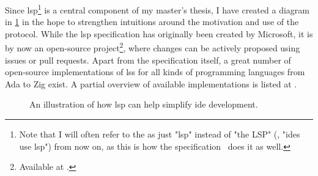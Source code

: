 \documentclass[../thesis]{subfiles}
\begin{document}
\noindent{}Since \gls{lsp}\footnote{%
	Note that I will often refer to the  as just "\gls{lsp}" instead of "the LSP" (\eg, "\glspl{ide} use \gls{lsp}") from now on, as this is how the specification~\cite{lsp} does it as well.
} is a central component of my master's thesis, I have created a diagram in \cref{fig:lsp} in the hope to strengthen intuitions around the motivation and use of the protocol.
While the \gls{lsp} specification has originally been created by Microsoft, it is by now an open-source project\footnote{
	Available at .
}, where changes can be actively proposed using issues or pull requests.
Apart from the specification itself, a great number of open-source implementations of \glspl{ls} for all kinds of programming languages from Ada to Zig exist.
A partial overview of available implementations is listed at .

\begin{figure}[hbtp]
	\begin{center}
	\end{center}
	\caption{An illustration of how \gls{lsp} can help simplify \gls{ide} development.}\label{fig:lsp}
\end{figure}
\end{document}
